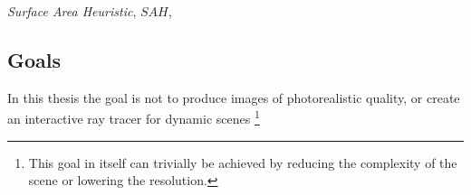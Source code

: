 



\textit{Surface Area Heuristic}, $SAH$, 



\subsection{Goals}

In this thesis the goal is not to produce images of photorealistic
quality, or create an interactive ray tracer for dynamic
scenes \footnote{This goal in itself can trivially be achieved by
  reducing the complexity of the scene or lowering the resolution.}





